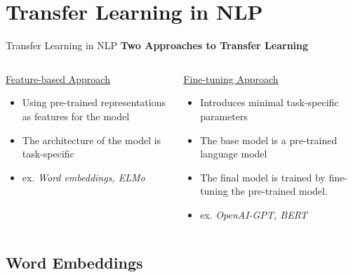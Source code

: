\documentclass[aspectratio=169]{beamer}
\begin{document}
\section{Transfer Learning in NLP}

\begin{frame}{Transfer Learning in NLP}
\centering
\textbf{Two Approaches to Transfer Learning}
\vspace{.3cm}

\begin{columns}
\begin{column}{0.5\textwidth}
   \centering 
   \underline{Feature-based Approach}
   
   \begin{itemize}
   	\item Using pre-trained representations as features for the model
	\item The architecture of the model is task-specific
	\item ex. \textit{Word embeddings, ELMo}
   \end{itemize}
   
\end{column}
\begin{column}{0.5\textwidth}  %
    \centering
    \underline{Fine-tuning Approach}
    
    \begin{itemize}
	\item Introduces minimal task-specific parameters
	\item The base model is a pre-trained language model
	\item The final model is trained by fine-tuning the pre-trained model.
	\item ex. \textit{OpenAI-GPT, BERT}
    \end{itemize}

\end{column}
\end{columns}
\end{frame}


\subsection{Word Embeddings}
\end{document}
